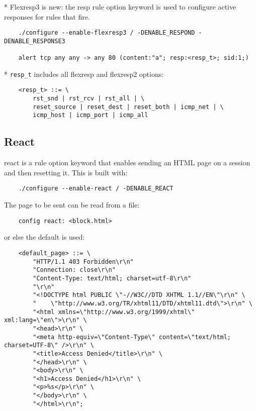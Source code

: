 \documentclass[english]{report}
\begin{document}
* Flexresp3 is new: the resp rule option keyword is used to configure active
  responses for rules that fire.

\begin{verbatim}
    ./configure --enable-flexresp3 / -DENABLE_RESPOND -DENABLE_RESPONSE3

    alert tcp any any -> any 80 (content:"a"; resp:<resp_t>; sid:1;)
\end{verbatim}

* \texttt{resp\_t} includes all flexresp and flexresp2 options:

\begin{verbatim}
    <resp_t> ::= \
        rst_snd | rst_rcv | rst_all | \
        reset_source | reset_dest | reset_both | icmp_net | \
        icmp_host | icmp_port | icmp_all
\end{verbatim}

\subsection{React}
\label{react section}

react is a rule option keyword that enables sending an HTML page on a session
and then resetting it.  This is built with:

\begin{verbatim}
    ./configure --enable-react / -DENABLE_REACT
\end{verbatim}

The page to be sent can be read from a file:

\begin{verbatim}
    config react: <block.html>
\end{verbatim}

or else the default is used:

\begin{verbatim}
    <default_page> ::= \
        "HTTP/1.1 403 Forbidden\r\n"
        "Connection: close\r\n"
        "Content-Type: text/html; charset=utf-8\r\n"
        "\r\n"
        "<!DOCTYPE html PUBLIC \"-//W3C//DTD XHTML 1.1//EN\"\r\n" \
        "    \"http://www.w3.org/TR/xhtml11/DTD/xhtml11.dtd\">\r\n" \
        "<html xmlns=\"http://www.w3.org/1999/xhtml\" xml:lang=\"en\">\r\n" \
        "<head>\r\n" \
        "<meta http-equiv=\"Content-Type\" content=\"text/html; charset=UTF-8\" />\r\n" \
        "<title>Access Denied</title>\r\n" \
        "</head>\r\n" \
        "<body>\r\n" \
        "<h1>Access Denied</h1>\r\n" \
        "<p>%s</p>\r\n" \
        "</body>\r\n" \
        "</html>\r\n";
\end{verbatim}
\end{document}
